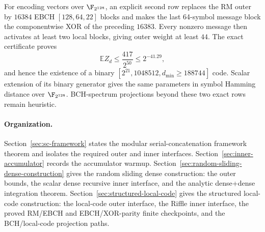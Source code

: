 For encoding vectors over \(\F_{2^{128}}\), an explicit second row replaces
the RM outer by \(16384\) EBCH \([128,64,22]\) blocks and makes the last
64-symbol message block the componentwise XOR of the preceding \(16383\).
Every nonzero message then activates at least two local blocks, giving outer
weight at least \(44\).  The exact certificate proves
\[
 \mathbb E Z_d\le\frac{417}{2^{50}}\le2^{-41.29},
\]
and hence the existence of a binary
\([2^{21},1048512,d_{\min}\ge188744]\) code.  Scalar extension of its binary
generator gives the same parameters in symbol Hamming distance over
\(\F_{2^{128}}\).  BCH-spectrum projections beyond these two exact rows remain
heuristic.

\paragraph{Organization.}
Section~\ref{sec:sc-framework} states the modular serial-concatenation framework theorem and isolates the required outer and inner interfaces.
Section~\ref{sec:inner-accumulator} records the accumulator warmup.
Section~\ref{sec:random-sliding-dense-construction} gives the random sliding
dense construction: the outer bounds, the scalar dense recursive inner
interface, and the analytic dense+dense integration theorem.
Section~\ref{sec:structured-local-code} gives the structured local-code
construction: the local-code outer interface, the Riffle inner interface,
the proved RM/EBCH and EBCH/XOR-parity finite checkpoints, and the
BCH/local-code projection paths.
